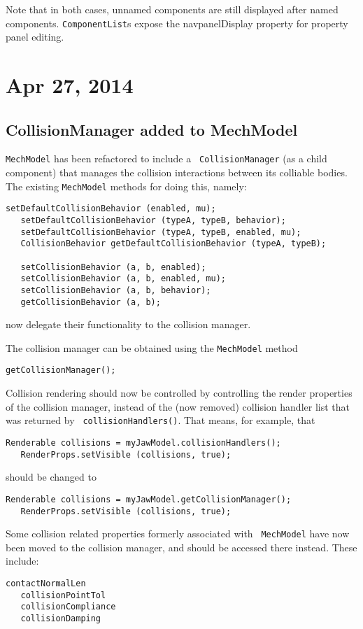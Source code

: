 \documentclass{article}
\begin{document}
Note that in both cases, unnamed components are still displayed after
named components. {\tt ComponentList}s expose the {\sf navpanelDisplay}
property for property panel editing.

\section*{Apr 27, 2014}

\subsection*{CollisionManager added to MechModel}

{\tt MechModel} has been refactored to include a {\tt
CollisionManager} (as a child component) that manages the collision
interactions between its colliable bodies. The existing
{\tt MechModel} methods for doing this, namely:
\begin{lstlisting}[]
   setDefaultCollisionBehavior (enabled, mu);
   setDefaultCollisionBehavior (typeA, typeB, behavior);
   setDefaultCollisionBehavior (typeA, typeB, enabled, mu);
   CollisionBehavior getDefaultCollisionBehavior (typeA, typeB);

   setCollisionBehavior (a, b, enabled);
   setCollisionBehavior (a, b, enabled, mu);
   setCollisionBehavior (a, b, behavior);
   getCollisionBehavior (a, b);
\end{lstlisting}
now delegate their functionality to the collision manager.

The collision manager can be obtained using the {\tt MechModel} method
\begin{lstlisting}[]
   getCollisionManager();
\end{lstlisting}
Collision rendering should now be controlled by controlling the render
properties of the collision manager, instead of the (now removed)
collision handler list that was returned by {\tt
collisionHandlers()}. That means, for example, that
\begin{lstlisting}[]
   Renderable collisions = myJawModel.collisionHandlers();
   RenderProps.setVisible (collisions, true);
\end{lstlisting}
should be changed to 
\begin{lstlisting}[]
   Renderable collisions = myJawModel.getCollisionManager();
   RenderProps.setVisible (collisions, true);
\end{lstlisting}

Some collision related properties formerly associated with {\tt
MechModel} have now been moved to the collision manager, and should be
accessed there instead. These include:
\begin{lstlisting}[]
   contactNormalLen
   collisionPointTol
   collisionCompliance
   collisionDamping
\end{lstlisting}
\end{document}
